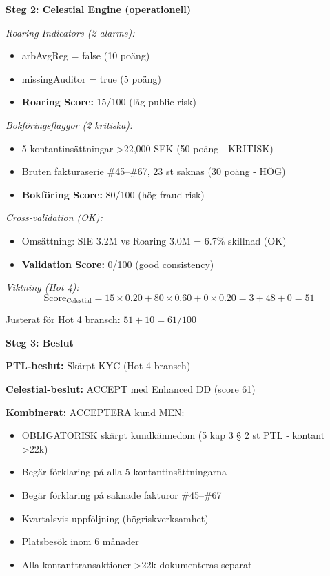 \documentclass{article}
\begin{document}
\textbf{Steg 2: Celestial Engine (operationell)}

\textit{Roaring Indicators (2 alarms):}
\begin{itemize}
\item arbAvgReg = false (10 poäng)
\item missingAuditor = true (5 poäng)
\item \textbf{Roaring Score:} 15/100 (låg public risk)
\end{itemize}

\textit{Bokföringsflaggor (2 kritiska):}
\begin{itemize}
\item 5 kontantinsättningar >22,000 SEK (50 poäng - KRITISK)
\item Bruten fakturaserie \#45--\#67, 23 st saknas (30 poäng - HÖG)
\item \textbf{Bokföring Score:} 80/100 (hög fraud risk)
\end{itemize}

\textit{Cross-validation (OK):}
\begin{itemize}
\item Omsättning: SIE 3.2M vs Roaring 3.0M = 6.7\% skillnad (OK)
\item \textbf{Validation Score:} 0/100 (good consistency)
\end{itemize}

\textit{Viktning (Hot 4):}
\[
\text{Score}_{\text{Celestial}} = 15 \times 0.20 + 80 \times 0.60 + 0 \times 0.20 = 3 + 48 + 0 = 51
\]

Justerat för Hot 4 bransch: $51 + 10 = 61/100$

\textbf{Steg 3: Beslut}

\begin{tcolorbox}[colback=red!10]
\textbf{PTL-beslut:} Skärpt KYC (Hot 4 bransch)

\textbf{Celestial-beslut:} ACCEPT med Enhanced DD (score 61)

\textbf{Kombinerat:} ACCEPTERA kund MEN:
\begin{itemize}
\item OBLIGATORISK skärpt kundkännedom (5 kap 3 § 2 st PTL - kontant >22k)
\item Begär förklaring på alla 5 kontantinsättningarna
\item Begär förklaring på saknade fakturor \#45--\#67
\item Kvartalsvis uppföljning (högriskverksamhet)
\item Platsbesök inom 6 månader
\item Alla kontanttransaktioner >22k dokumenteras separat
\end{itemize}
\end{tcolorbox}
\end{document}
